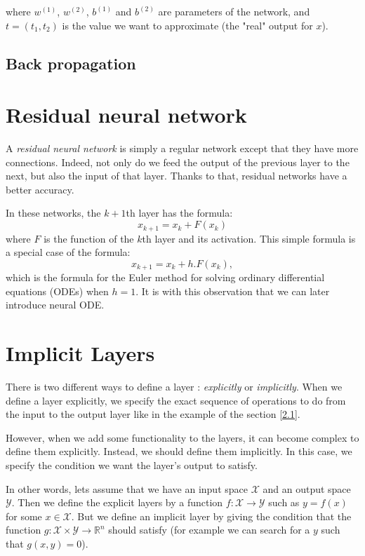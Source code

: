 \documentclass[10pt,a4paper]{article}
\theoremstyle{definition}
\theoremstyle{definition}
\begin{document}
where $w^{(1)}$, $w^{(2)}$, $b^{(1)}$ and $b^{(2)}$ are parameters of the network, and $t = (t_1, t_2)$ is the value we want to approximate (the "real" output for $x$). 

\subsection{Back propagation}

\section{Residual neural network} \label{rnn}

A \textit{residual neural network} is simply a regular network except that they have more connections. Indeed, not only do we feed the output of the previous layer to the next, but also the input of that layer. Thanks to that, residual networks have a better accuracy. 

In these networks, the $k+1$th layer has the formula:
\[
x_{k+1} = x_k + F(x_k)
\]
where $F$ is the function of the $k$th layer and its activation. This simple formula is a special case of the formula:
\[
x_{k+1} = x_k + h.F(x_k),
\]
which is the formula for the Euler method for solving ordinary differential equations (ODEs) when $h = 1$. It is with this observation that we can later introduce neural ODE.

\section{Implicit Layers}

There is two different ways to define a layer : \textit{explicitly} or \textit{implicitly}. When we define a layer explicitly, we specify the exact sequence of operations to do from the input to the output layer like in the example of the section \ref{2.1}. 

However, when we add some functionality to the layers, it can become complex to define them explicitly. Instead, we should define them implicitly. In this case, we specify the condition we want the layer's output to satisfy. 

In other words, lets assume that we have an input space $\mathcal{X}$ and an output space $\mathcal{Y}$. Then we define the explicit layers by a function $f : \mathcal{X} \rightarrow \mathcal{Y}$ such as $y = f(x)$ for some $x \in \mathcal{X}$. But we define an implicit layer by giving the condition that the function $g: \mathcal{X} \times \mathcal{Y} \rightarrow \mathbb{R}^n$ should satisfy (for example we can search for a $y$ such that $g(x,y) = 0$).
\end{document}
